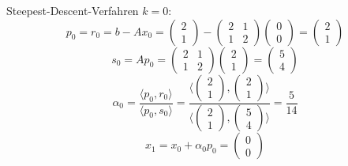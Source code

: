 \begin{example}{Steepest-Descent-Verfahren}
    $k = 0$:
    \[
        p_0 = r_0 = b - Ax_0 =
        \begin{pmatrix}
            2 \\ 1
        \end{pmatrix}
        -
        \begin{pmatrix}
            2 & 1 \\
            1 & 2
        \end{pmatrix}
        \begin{pmatrix}
            0 \\ 0
        \end{pmatrix}
        =
        \begin{pmatrix}
            2 \\ 1
        \end{pmatrix}
    \]
    \[
        s_0 = A p_0 =
        \begin{pmatrix}
            2 & 1 \\
            1 & 2
        \end{pmatrix}
        \begin{pmatrix}
            2 \\ 1
        \end{pmatrix}
        =
        \begin{pmatrix}
            5 \\ 4
        \end{pmatrix}
    \]
    \[
        \alpha_0 = \frac{\langle p_0, r_0 \rangle}{\langle p_0, s_0 \rangle} = \frac{\langle
            \begin{pmatrix}
                2 \\ 1
            \end{pmatrix},
            \begin{pmatrix}
                2 \\ 1
            \end{pmatrix}
            \rangle}{\langle
            \begin{pmatrix}
                2 \\ 1
            \end{pmatrix},
            \begin{pmatrix}
                5 \\ 4
            \end{pmatrix}
            \rangle} = \frac{5}{14}
    \]
    \[
        x_{1} = x_0 + \alpha_0 p_0 =
        \begin{pmatrix}
            0 \\ 0
        \end{pmatrix}
\]
\end{example}
